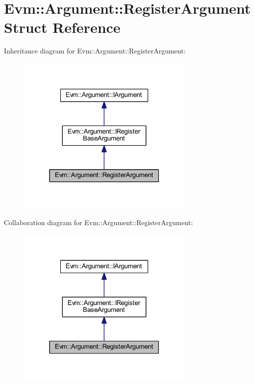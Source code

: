 \hypertarget{struct_evm_1_1_argument_1_1_register_argument}{}\section{Evm\+:\+:Argument\+:\+:Register\+Argument Struct Reference}
\label{struct_evm_1_1_argument_1_1_register_argument}


Inheritance diagram for Evm\+:\+:Argument\+:\+:Register\+Argument\+:
\nopagebreak
\begin{figure}[H]
\begin{center}
\leavevmode
\includegraphics[width=247pt]{struct_evm_1_1_argument_1_1_register_argument__inherit__graph}
\end{center}
\end{figure}


Collaboration diagram for Evm\+:\+:Argument\+:\+:Register\+Argument\+:
\nopagebreak
\begin{figure}[H]
\begin{center}
\leavevmode
\includegraphics[width=247pt]{struct_evm_1_1_argument_1_1_register_argument__coll__graph}
\end{center}
\end{figure}
